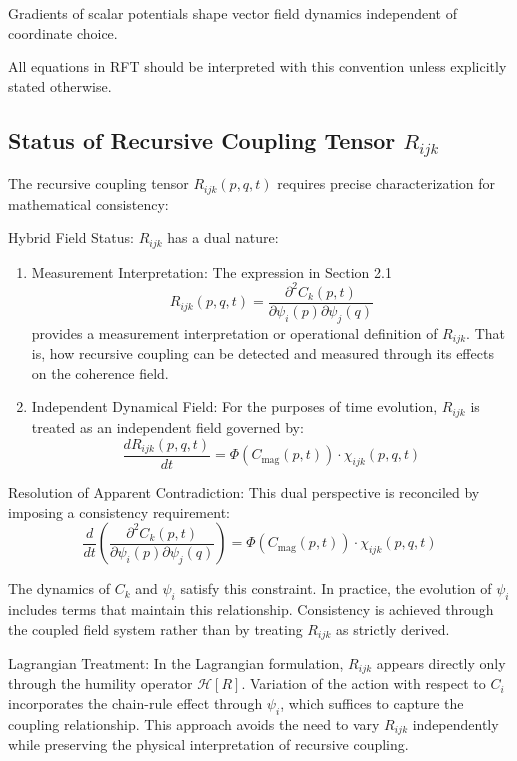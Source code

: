 Gradients of scalar potentials shape vector field dynamics independent of coordinate choice.

All equations in RFT should be interpreted with this convention unless explicitly stated otherwise.

\subsection{Status of Recursive Coupling Tensor \(R_{ijk}\)}

The recursive coupling tensor \(R_{ijk}(p,q,t)\) requires precise characterization for mathematical consistency:

Hybrid Field Status:
\(R_{ijk}\) has a dual nature:
\begin{enumerate}
    \item Measurement Interpretation: The expression in Section 2.1
    \begin{equation}
    R_{ijk}(p, q, t) = \frac{\partial^2 C_k(p,t)}{\partial \psi_i(p) \partial \psi_j(q)}
    \end{equation}
    provides a measurement interpretation or operational definition of \(R_{ijk}\). That is, how recursive coupling can be detected and measured through its effects on the coherence field.
    \item Independent Dynamical Field: For the purposes of time evolution, \(R_{ijk}\) is treated as an independent field governed by:
    \begin{equation}
    \frac{dR_{ijk}(p,q,t)}{dt} = \Phi(C_{\mathrm{mag}}(p,t)) \cdot \chi_{ijk}(p,q,t)
    \end{equation}
\end{enumerate}

Resolution of Apparent Contradiction:
This dual perspective is reconciled by imposing a consistency requirement:
\begin{equation}
\frac{d}{dt}\left(\frac{\partial^2 C_k(p,t)}{\partial \psi_i(p) \partial \psi_j(q)}\right) = \Phi(C_{\mathrm{mag}}(p,t)) \cdot \chi_{ijk}(p,q,t)
\end{equation}

The dynamics of \(C_k\) and \(\psi_i\) satisfy this constraint. In practice, the evolution of \(\psi_i\) includes terms that maintain this relationship. Consistency is achieved through the coupled field system rather than by treating \(R_{ijk}\) as strictly derived.

Lagrangian Treatment:
In the Lagrangian formulation, \(R_{ijk}\) appears directly only through the humility operator \(\mathcal{H}[R]\). Variation of the action with respect to \(C_i\) incorporates the chain-rule effect through \(\psi_i\), which suffices to capture the coupling relationship. This approach avoids the need to vary \(R_{ijk}\) independently while preserving the physical interpretation of recursive coupling. 
